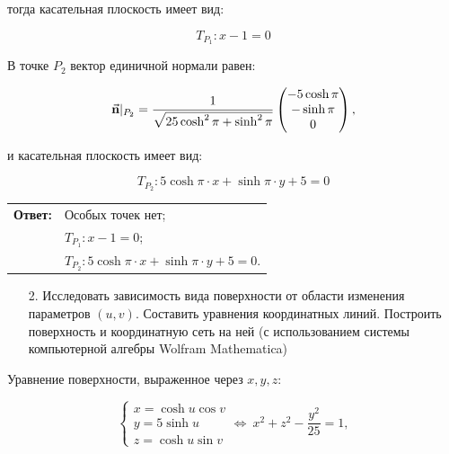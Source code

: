 \documentclass[12pt,a4paper]{article}
\begin{document}
    \noindent тогда касательная плоскость имеет вид: 

    \[
        T_{P_1}: x - 1 = 0
    \]


    В точке $ {P_2} $ вектор единичной нормали равен:

    \[
        \vec{\textbf n}|_{P_2} = \frac{1}{\sqrt{25 \cosh^2 \pi + \sinh^2 \pi}}
        \begin{pmatrix}
            -5 \cosh \pi
            \\
            -\sinh \pi
            \\
            0
        \end{pmatrix}, 
    \]

    \noindent и касательная плоскость имеет вид: 

    \[
        T_{P_2}: 5 \cosh \pi \cdot x + \sinh \pi \cdot y + 5 = 0
    \]

    \bigskip

    \begin{flushright}
        \begin{tabular}{rl}
            \textbf{Ответ:} & Особых точек нет;

            \\

                            & $ T_{P_1}: x - 1 = 0 $;

            \\

                            & $ T_{P_2}: 5 \cosh \pi \cdot x + \sinh \pi \cdot y + 5 = 0 $.
        \end{tabular}
    \end{flushright}

    \pagebreak

    \begin{enumerate}
        \item[2.] Исследовать зависимость вида поверхности от области изменения параметров $ (u, v) $. Составить уравнения координатных линий. Построить поверхность и координатную сеть на ней (с использованием системы компьютерной алгебры Wolfram Mathematica)
    \end{enumerate}

    
    Уравнение поверхности, выраженное через $ x, y, z $: 

    \[
        \begin{cases}
            x = \cosh u \cos v
            \\
            y = 5 \sinh u
            \\
            z = \cosh u \sin v
        \end{cases} 
        \Leftrightarrow \ 
        x^2 + z^2 - \frac{y^2}{25} = 1, 
    \]
\end{document}
